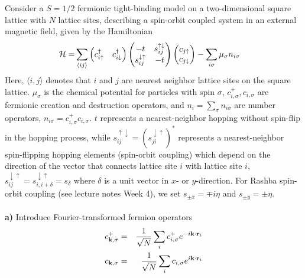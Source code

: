 \begin{problem}
	
	
	Consider a $S=1/2$ fermionic  tight-binding model on a two-dimensional square lattice with $N$ lattice sites, describing a spin-orbit coupled system in an external magnetic field, given by the Hamiltonian 
	\begin{align}
		\begin{split}
			\mathcal{H} =&   \sum_{\langle ij \rangle} 
			\begin{pmatrix} c_{i\uparrow}^\dagger & c_{i\downarrow}^\dagger  \end{pmatrix}
			\begin{pmatrix} -t & s_{ij}^{\uparrow\downarrow} \\ s_{ij}^{\downarrow\uparrow} & -t \end{pmatrix}  
			\begin{pmatrix} c_{j\uparrow} \\ c_{j\downarrow}  \end{pmatrix}
			- \sum_{i \sigma} \mu_\sigma n_{i\sigma} \nonumber 
		\end{split}
	\end{align}
	Here,  $\langle i,j \rangle$ denotes that $i$ and $j$ are nearest neighbor lattice sites on the square lattice. $\mu_{\sigma}$ is the chemical potential for particles with spin $\sigma$, $c^{+}_{i,\sigma}, c_{i,\sigma}$ are fermionic creation and destruction 
	operators, and $n_i = \sum_{\sigma} n_{i \sigma}$ are number operators, $n_{i \sigma} = c^{+}_{i,\sigma} c_{i,\sigma}$. $t$ represents a nearest-neighbor hopping without spin-flip in the hopping process, 
	while $ s_{ij}^{\uparrow\downarrow} = (s_{ji}^{\downarrow\uparrow} )^*$ represents a nearest-neighbor spin-flipping hopping elements (spin-orbit coupling) which depend on the direction of the vector that connects lattice site $i$ with lattice site $i$, 
	$s_{ij}^{\downarrow\uparrow} =s_{i, i+\delta}^{\downarrow\uparrow} = s_{\delta} $ where $\delta$ is a unit vector in $x$- or $y$-direction.  For Rashba spin-orbit coupling (see lecture notes Week 4), we set $s_{\pm \hat{ x}} = \mp i \eta$ 
	and $s_{\pm \hat{y}}= \pm \eta$. 
	\ \\
	\ \\
	{\bf a)} Introduce Fourier-transformed fermion operators 
	\begin{eqnarray}
		c^{+}_{{\bf k},\sigma} & = & \frac{1}{\sqrt{N}} \sum_i c^{+}_{i,\sigma} e^{-i {\bf k} \cdot {\bf r}_i} \nonumber \\
		c_{{\bf k},\sigma} & = & \frac{1}{\sqrt{N}} \sum_i c_{i,\sigma} e^{i {\bf k} \cdot {\bf r}_i} \nonumber

\end{eqnarray}
\end{problem}
